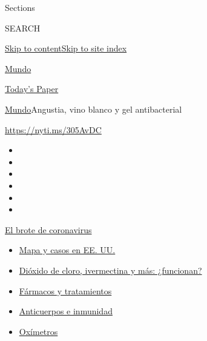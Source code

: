 Sections

SEARCH

\protect\hyperlink{site-content}{Skip to
content}\protect\hyperlink{site-index}{Skip to site index}

\href{https://www.nytimes3xbfgragh.onion/es/section/mundo}{Mundo}

\href{https://myaccount.nytimes3xbfgragh.onion/auth/login?response_type=cookie\&client_id=vi}{}

\href{https://www.nytimes3xbfgragh.onion/section/todayspaper}{Today's
Paper}

\href{/es/section/mundo}{Mundo}\textbar{}Angustia, vino blanco y gel
antibacterial

\url{https://nyti.ms/305AvDC}

\begin{itemize}
\item
\item
\item
\item
\item
\item
\end{itemize}

\href{https://www.nytimes3xbfgragh.onion/es/spotlight/coronavirus?action=click\&pgtype=Article\&state=default\&region=TOP_BANNER\&context=storylines_menu}{El
brote de coronavirus}

\begin{itemize}
\tightlist
\item
  \href{https://www.nytimes3xbfgragh.onion/es/interactive/2020/espanol/mundo/coronavirus-en-estados-unidos.html?action=click\&pgtype=Article\&state=default\&region=TOP_BANNER\&context=storylines_menu}{Mapa
  y casos en EE. UU.}
\item
  \href{https://www.nytimes3xbfgragh.onion/es/2020/07/23/espanol/america-latina/bolivia-cloro-coronavirus-ivermectina.html?action=click\&pgtype=Article\&state=default\&region=TOP_BANNER\&context=storylines_menu}{Dióxido
  de cloro, ivermectina y más: ¿funcionan?}
\item
  \href{https://www.nytimes3xbfgragh.onion/es/interactive/2020/science/coronavirus-tratamientos-curas.html?action=click\&pgtype=Article\&state=default\&region=TOP_BANNER\&context=storylines_menu}{Fármacos
  y tratamientos}
\item
  \href{https://www.nytimes3xbfgragh.onion/es/2020/07/28/espanol/ciencia-y-tecnologia/anticuerpos-coronavirus-inmunidad.html?action=click\&pgtype=Article\&state=default\&region=TOP_BANNER\&context=storylines_menu}{Anticuerpos
  e inmunidad}
\item
  \href{https://www.nytimes3xbfgragh.onion/es/2020/04/29/espanol/estilos-de-vida/oximetro-para-que-sirve.html?action=click\&pgtype=Article\&state=default\&region=TOP_BANNER\&context=storylines_menu}{Oxímetros}
\end{itemize}

